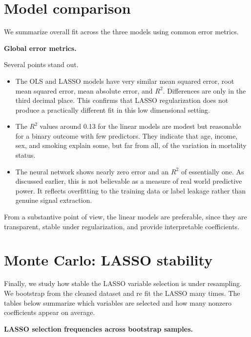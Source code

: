 \documentclass{article}
\begin{document}
\section{Model comparison}

We summarize overall fit across the three models using common error metrics.

\medskip
\noindent\textbf{Global error metrics.}
\par


Several points stand out.

\begin{itemize}
  \item The OLS and LASSO models have very similar mean squared error, root mean squared error, mean absolute error, and \(R^2\). Differences are only in the third decimal place. This confirms that LASSO regularization does not produce a practically different fit in this low dimensional setting.
  \item The \(R^2\) values around 0.13 for the linear models are modest but reasonable for a binary outcome with few predictors. They indicate that age, income, sex, and smoking explain some, but far from all, of the variation in mortality status.
  \item The neural network shows nearly zero error and an \(R^2\) of essentially one. As discussed earlier, this is not believable as a measure of real world predictive power. It reflects overfitting to the training data or label leakage rather than genuine signal extraction.
\end{itemize}

From a substantive point of view, the linear models are preferable, since they are transparent, stable under regularization, and provide interpretable coefficients.

\section{Monte Carlo: LASSO stability}

Finally, we study how stable the LASSO variable selection is under resampling. We bootstrap from the cleaned dataset and re fit the LASSO many times. The tables below summarize which variables are selected and how many nonzero coefficients appear on average.

\medskip
\noindent\textbf{LASSO selection frequencies across bootstrap samples.}
\par

\end{document}
